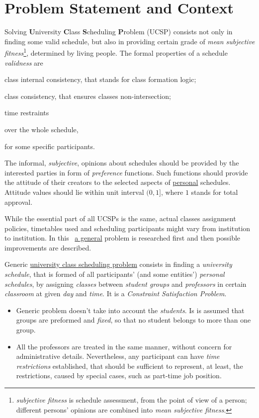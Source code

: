 \documentclass[header]{subfiles}
\begin{document}
\section{Problem Statement and Context}
Solving \textbf{U}niversity \textbf{C}lass \textbf{S}cheduling \textbf{P}roblem (UCSP)
consists not only in finding some valid schedule, but also in providing certain
grade of \emph{mean subjective fitness}\footnote{%
  \emph{subjective fitness} is schedule assessment, from the point of
  view of a person; different persons' opinions are combined into
  \emph{mean subjective fitness}.%
}, determined by living people.
The formal properties of a schedule \emph{validness} are
\begin{enumerate*}[1)]
  \item class internal consistency, that stands for class formation logic;
  \item class consistency, that ensures classes non-intersection;
  \item time restraints
    \begin{enumerate*}[(a)]
      \item over the whole schedule,
      \item for some specific participants.
    \end{enumerate*}
\end{enumerate*}
The informal, \emph{subjective}, opinions about schedules should be provided by
the interested parties in form of \emph{preference} functions. Such functions
should provide the attitude of their creators to the selected aspects of
\underline{personal} schedules. Attitude values should lie within unit interval
$(0,1]$, where $1$ stands for total approval.

While the essential part of all UCSPs is the same, actual classes assignment
policies, timetables used and scheduling participants might vary from institution
to institution. In this \thisdoc\ \underline{a general} problem is researched
first and then possible improvements are described.

\bigskip
Generic \underline{university class scheduling problem} consists in finding a
\emph{university schedule}, that is formed of all participants' (and some entities')
\emph{personal schedules}, by assigning \emph{classes} between \emph{student groups}
and \emph{professors} in certain \emph{classroom} at given \emph{day} and
\emph{time}. It is a \emph{Constraint Satisfaction Problem}.

\begin{itemize}
  \item Generic problem doesn't take into account the \emph{students}.
        Is is assumed that groups are preformed and \emph{fixed}, so that
        no student belongs to more than one group.
  \item All the professors are treated in the same manner, without concern for
        administrative details. Nevertheless, any participant can have
        \emph{time restrictions} established, that should be sufficient to
        represent, at least, the restrictions, caused by special cases,
        such as part-time job position.
\end{itemize}
\end{document}
